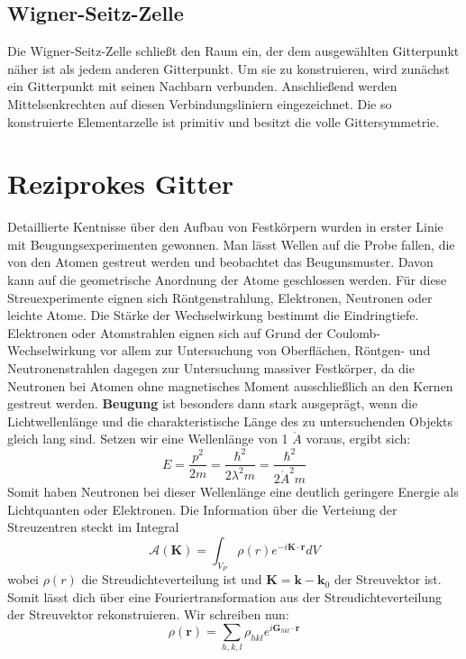 \documentclass[11pt]{article}
\begin{document}
\subsection{Wigner-Seitz-Zelle}
Die Wigner-Seitz-Zelle schließt den Raum ein, der dem ausgewählten Gitterpunkt
näher ist als jedem anderen Gitterpunkt. Um sie zu konstruieren, wird zunächst
ein Gitterpunkt mit seinen Nachbarn verbunden. Anschließend werden
Mittelsenkrechten auf diesen Verbindungsliniern eingezeichnet. Die so
konstruierte Elementarzelle ist primitiv und besitzt die volle Gittersymmetrie.
\section{Reziprokes Gitter}
Detaillierte Kentnisse über den Aufbau von Festkörpern wurden in erster Linie
mit Beugungsexperimenten gewonnen. Man lässt Wellen auf die Probe fallen, die
von den Atomen gestreut werden und beobachtet das Beugunsmuster. Davon kann
auf die geometrische Anordnung der Atome geschlossen werden. Für diese
Streuexperimente eignen sich Röntgenstrahlung, Elektronen, Neutronen oder
leichte Atome. Die Stärke der Wechselwirkung bestimmt die Eindringtiefe.
Elektronen oder Atomstrahlen eignen sich auf Grund der Coulomb-Wechselwirkung
vor allem zur Untersuchung von Oberflächen, Röntgen- und Neutronenstrahlen
dagegen zur Untersuchung massiver Festkörper, da die Neutronen bei Atomen ohne
magnetisches Moment ausschließlich an den Kernen gestreut werden. \textbf{
Beugung} ist besonders dann stark ausgeprägt, wenn die Lichtwellenlänge und die
charakteristische Länge des zu untersuchenden Objekts gleich lang sind.
Setzen wir eine Wellenlänge von 1 $\mathring{A}$ voraus, ergibt sich:
\begin{equation}
  E = \frac{p^2}{2m} = \frac{\hbar^2}{2\lambda^2m} = \frac{\hbar^2}{2
  \mathring{A}^2m}
\end{equation}
Somit haben Neutronen bei dieser Wellenlänge eine deutlich geringere Energie
als Lichtquanten oder Elektronen. Die Information über die Verteiung der
Streuzentren steckt im Integral
\begin{equation}
  \mathcal{A}(\bm{K})=\int_{V_P}\rho(r)e^{-i\bm{K}\cdot\bm{r}}dV
\end{equation}
wobei $\rho(r)$ die Streudichteverteilung ist und $\bm{K}=\bm{k}-\bm{k}_0$
der Streuvektor ist. Somit lässt dich über eine Fouriertransformation aus der
Streudichteverteilung der Streuvektor rekonstruieren. Wir schreiben nun:
\begin{equation}
  \rho(\bm{r})=\sum_{h,k,l}\rho_{hkl}e^{i\bm{G}_{hkl}\cdot\bm{r}}
\end{equation}
\end{document}
